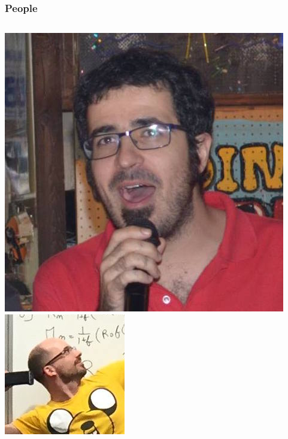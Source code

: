 \documentclass{beamer}
\begin{document}
\begin{frame}
\frametitle{People}
\begin{columns}
\begin{columns}
\includegraphics[width=\textwidth]{ABC.jpg}
\includegraphics[width=\textwidth]{Jeremie.jpg}

\end{columns}
\end{columns}
\end{frame}
\end{document}
